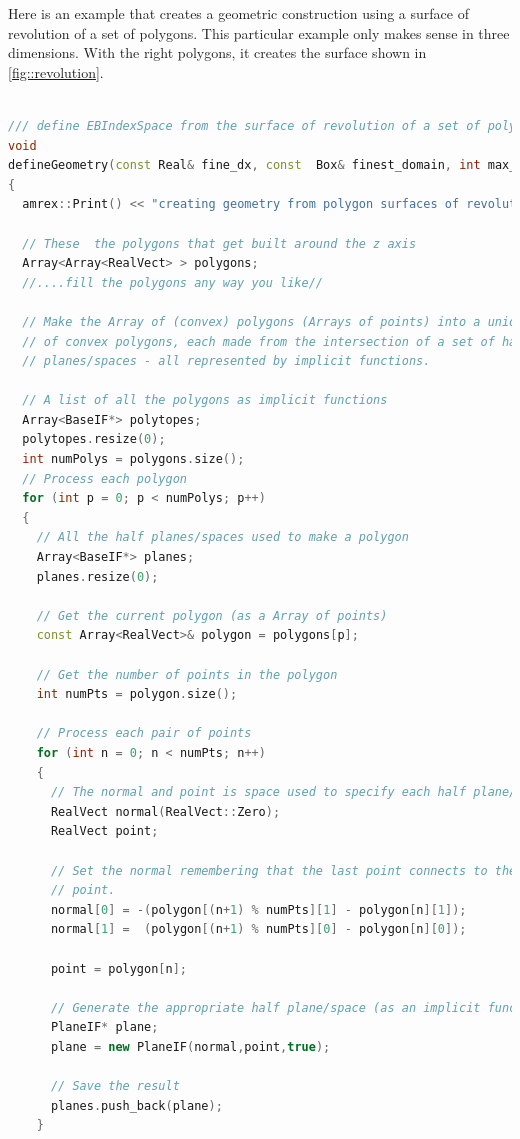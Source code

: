 Here is an example that creates a geometric construction using a
surface of revolution of a set of polygons.   This particular example
only makes sense in three dimensions.   With the right polygons, it
creates the surface shown in \ref{fig::revolution}.

\begin{lstlisting}[language=cpp]

/// define EBIndexSpace from the surface of revolution of a set of polygons
void
defineGeometry(const Real& fine_dx, const  Box& finest_domain, int max_grid_size)
{
  amrex::Print() << "creating geometry from polygon surfaces of revolution" << endl;

  // These  the polygons that get built around the z axis
  Array<Array<RealVect> > polygons;
  //....fill the polygons any way you like//

  // Make the Array of (convex) polygons (Arrays of points) into a union
  // of convex polygons, each made from the intersection of a set of half
  // planes/spaces - all represented by implicit functions.

  // A list of all the polygons as implicit functions
  Array<BaseIF*> polytopes;
  polytopes.resize(0);
  int numPolys = polygons.size();
  // Process each polygon
  for (int p = 0; p < numPolys; p++)
  {
    // All the half planes/spaces used to make a polygon
    Array<BaseIF*> planes;
    planes.resize(0);

    // Get the current polygon (as a Array of points)
    const Array<RealVect>& polygon = polygons[p];

    // Get the number of points in the polygon
    int numPts = polygon.size();

    // Process each pair of points
    for (int n = 0; n < numPts; n++)
    {
      // The normal and point is space used to specify each half plane/space
      RealVect normal(RealVect::Zero);
      RealVect point;

      // Set the normal remembering that the last point connects to the first
      // point.
      normal[0] = -(polygon[(n+1) % numPts][1] - polygon[n][1]);
      normal[1] =  (polygon[(n+1) % numPts][0] - polygon[n][0]);

      point = polygon[n];

      // Generate the appropriate half plane/space (as an implicit function)
      PlaneIF* plane;
      plane = new PlaneIF(normal,point,true);

      // Save the result
      planes.push_back(plane);
    }


\end{lstlisting}
